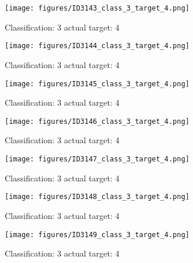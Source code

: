 \begin{figure}[h!]
\begin{center}
\texttt{[image: figures/ID3143\_class\_3\_target\_4.png]}
\end{center}
\caption{ Classification: 3 actual target: 4}
\label{fig:ID3143_class_3_target_4}
\end{figure}
\begin{figure}[h!]
\begin{center}
\texttt{[image: figures/ID3144\_class\_3\_target\_4.png]}
\end{center}
\caption{ Classification: 3 actual target: 4}
\label{fig:ID3144_class_3_target_4}
\end{figure}
\begin{figure}[h!]
\begin{center}
\texttt{[image: figures/ID3145\_class\_3\_target\_4.png]}
\end{center}
\caption{ Classification: 3 actual target: 4}
\label{fig:ID3145_class_3_target_4}
\end{figure}
\begin{figure}[h!]
\begin{center}
\texttt{[image: figures/ID3146\_class\_3\_target\_4.png]}
\end{center}
\caption{ Classification: 3 actual target: 4}
\label{fig:ID3146_class_3_target_4}
\end{figure}
\begin{figure}[h!]
\begin{center}
\texttt{[image: figures/ID3147\_class\_3\_target\_4.png]}
\end{center}
\caption{ Classification: 3 actual target: 4}
\label{fig:ID3147_class_3_target_4}
\end{figure}
\begin{figure}[h!]
\begin{center}
\texttt{[image: figures/ID3148\_class\_3\_target\_4.png]}
\end{center}
\caption{ Classification: 3 actual target: 4}
\label{fig:ID3148_class_3_target_4}
\end{figure}
\begin{figure}[h!]
\begin{center}
\texttt{[image: figures/ID3149\_class\_3\_target\_4.png]}
\end{center}
\caption{ Classification: 3 actual target: 4}
\label{fig:ID3149_class_3_target_4}
\end{figure}
